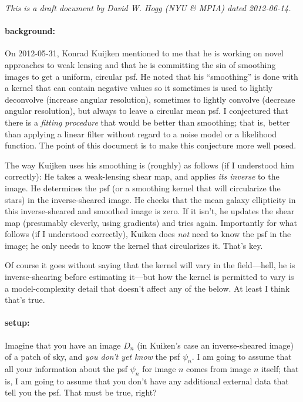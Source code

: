 \documentclass[12pt]{article}
\begin{document}
\noindent\textsl{This is a draft document by David W. Hogg (NYU \& MPIA) dated 2012-06-14.}

\paragraph{background:}
On 2012-05-31, Konrad Kuijken mentioned to me that he is working on
novel approaches to weak lensing and that he is committing the sin of
smoothing images to get a uniform, circular psf.  He noted that his
``smoothing'' is done with a kernel that can contain negative values
so it sometimes is used to lightly deconvolve (increase angular
resolution), sometimes to lightly convolve (decrease angular
resolution), but always to leave a circular mean psf.  I conjectured
that there is a \emph{fitting procedure} that would be better than
smoothing; that is, better than applying a linear filter without
regard to a noise model or a likelihood function.  The point of this
document is to make this conjecture more well posed.

The way Kuijken uses his smoothing is (roughly) as follows (if I
understood him correctly): He takes a weak-lensing shear map, and
applies \emph{its inverse} to the image.  He determines the psf (or a
smoothing kernel that will circularize the stars) in the
inverse-sheared image.  He checks that the mean galaxy ellipticity in
this inverse-sheared and smoothed image is zero.  If it isn't, he
updates the shear map (presumably cleverly, using gradients) and tries
again.  Importantly for what follows (if I understood correctly),
Kuiken does \emph{not} need to know the psf in the image; he only
needs to know the kernel that circularizes it.  That's key.

Of course it goes without saying that the kernel will vary in the
field---hell, he is inverse-shearing before estimating it---but how
the kernel is permitted to vary is a model-complexity detail that
doesn't affect any of the below.  At least I think that's true.

\paragraph{setup:}
Imagine that you have an image $D_n$ (in Kuiken's case an
inverse-sheared image) of a patch of sky, and \emph{you don't yet
  know} the psf $\psi_n$.  I am going to assume that all your
information about the psf $\psi_n$ for image $n$ comes from image $n$
itself; that is, I am going to assume that you don't have any
additional external data that tell you the psf.  That must be true,
right?
\end{document}
